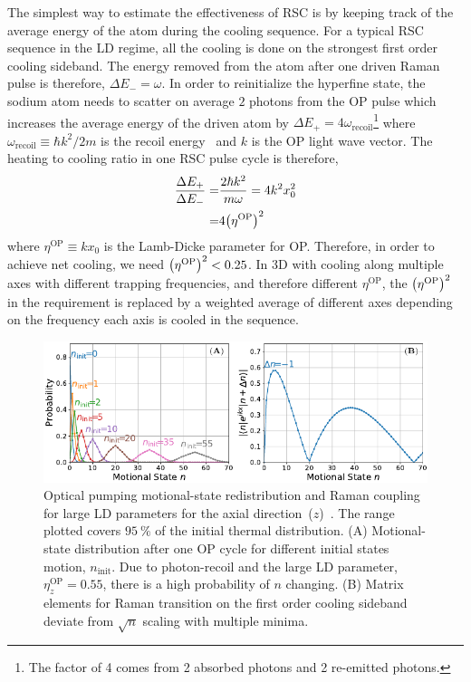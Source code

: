 The simplest way to estimate the effectiveness of RSC
is by keeping track of the average energy of the atom during the cooling sequence.
For a typical RSC sequence in the LD regime, all the cooling is done on
the strongest first order cooling sideband.
The energy removed from the atom after one driven Raman pulse is therefore, $\Delta E_-=\omega$.
In order to reinitialize the hyperfine state, the sodium atom needs to scatter on average
$2$ photons from the OP pulse which increases the average energy of the driven atom
by $\Delta E_+=4\omega_{\mathrm{recoil}}$\footnote{
  The factor of 4 comes from 2 absorbed photons and 2 re-emitted photons.}
where $\omega_{\mathrm{recoil}}\equiv \hbar k^2/2m$ is the recoil energy~\cite{steck_sodium_2019}
and $k$ is the OP light wave vector.
The heating to cooling ratio in one RSC pulse cycle is therefore,
\begin{align*}
  \frac{\Delta E_+}{\Delta E_-}=&\frac{2\hbar k^2}{m\omega}=4k^2x_0^2\\
  =&4{\left({\eta^{\mathrm{OP}}}\right)}^2
\end{align*}
where $\eta^{\mathrm{OP}}\equiv kx_0$ is the Lamb-Dicke parameter for OP.
Therefore, in order to achieve net cooling, we need ${\left({\eta^{\mathrm{OP}}}\right)}^2<0.25$.
In 3D with cooling along multiple axes with different trapping frequencies,
and therefore different $\eta^{\mathrm{OP}}$,
the ${\left({\eta^{\mathrm{OP}}}\right)}^2$ in the requirement
is replaced by a weighted average of different axes depending on the frequency
each axis is cooled in the sequence.

\begin{figure}
  \centering
  \includegraphics[width=\textwidth]{figures/na_rsc_challenges.pdf}
  \caption[Optical pumping motional-state redistribution and Raman coupling]{
    Optical pumping motional-state redistribution and Raman coupling for large LD parameters
    for the axial direction~($z$)~\cite{wineland_laser_1979}.
    The range plotted covers $95~\mathrm{\%}$ of the initial thermal distribution.
    (A) Motional-state distribution after one OP cycle for different initial states motion,
    $n_{\textrm{init}}$.
    Due to photon-recoil and the large LD parameter, $\eta^{\textrm{OP}}_z=0.55$,
    there is a high probability of $n$ changing.
    (B) Matrix elements for Raman transition on the first order cooling sideband
    deviate from $\sqrt{n}$ scaling with multiple minima.
    \label{fig:rsc:na-challenges}}
\end{figure}

